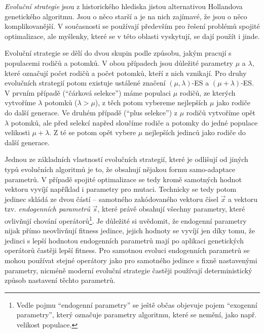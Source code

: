 
\emph{Evoluční strategie}\cite{rechenberg1973,schwefel1977numerische} jsou z historického hlediska jistou alternativou Hollandova genetického algoritmu. Jsou o něco starší a je na nich zajímavé, že jsou o něco komplikovanější. V současnosti se používají především pro řešení problémů spojité optimalizace, ale myšlenky, které se v této oblasti vyskytují, se dají použít i jinde.

Evoluční strategie se dělí do dvou skupin podle způsobu, jakým pracují s populacemi rodičů a potomků. V obou případech jsou důležité parametry $\mu$ a $\lambda$, které označují počet rodičů a počet potomků, kteří z nich vznikají. Pro druhy evolučních strategií potom existuje ustálené značení $(\mu, \lambda)$-ES a $(\mu + \lambda)$-ES. V prvním případě (``čárková selekce'') máme populaci $\mu$ rodičů, ze kterých vytvoříme $\lambda$ potomků ($\lambda > \mu$), z těch potom vybereme nejlepších $\mu$ jako rodiče do další generace.  Ve druhém případě (``plus selekce'') z $\mu$ rodičů vytvoříme opět $\lambda$ potomků, ale před selekcí napřed sloučíme rodiče a potomky do jedné populace velikosti $\mu + \lambda$. Z té se potom opět vybere $\mu$ nejlepších jedinců jako rodiče do další generace. 

Jednou ze základních vlastností evolučních strategií, které je odlišují od jiných typů evolučních algoritmů je to, že obsahují nějakou formu samo-adaptace parametrů. V případě spojité optimalizace se tedy kromě samotných hodnot vektoru vyvíjí například i parametry pro mutaci. Technicky se tedy potom jedinec skládá ze dvou částí -- samotného zakódovaného vektoru čísel $\vec{x}$ a vektoru tzv. \emph{endogenních parametrů} $\vec{s}$, které právě obsahují všechny parametry, které ovlivňují chování operátorů\footnote{Vedle pojmu ``endogenní parametry'' se ještě občas objevuje pojem ``exogenní parametry'', který označuje parametry algoritmu, které se nemění, jako např. velikost populace.}. Je důležité si uvědomit, že endogenní parametry nijak přímo neovlivňují fitness jedince, jejich hodnoty se vyvíjí jen díky tomu, že jedinci s lepší hodnotou endogenních parametrů mají po aplikaci genetických operátorů častěji lepší fitness. Pro samotnou evoluci endogenních parametrů se mohou používat stejné operátory jako pro samotného jedince s fixně nastavenými parametry, nicméně moderní evoluční strategie častěji používají deterministický způsob nastavení těchto parametrů.


